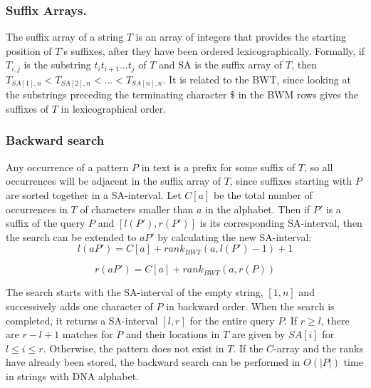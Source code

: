 \documentclass[runningheads,a4paper]{llncs}
\begin{document}
\subsubsection{Suffix Arrays.} The suffix array of a string $T$ is an array of integers that provides the starting position of $T$'s suffixes, after they have been ordered lexicographically. Formally, if $T_{i,j}$ is the substring $t_i t_{i+1} \ldots t_j$ of $T$ and SA is the suffix array of $T$, then $T_{SA[1],n}<T_{SA[2],n}<\ldots <T_{SA[n],n}$. It is related to the BWT, since looking at the substrings preceding the terminating character $\$$ in the BWM rows gives the suffixes of $T$ in lexicographical order. 
\subsubsection{Backward search}
Any occurrence of a pattern $P$ in text is a prefix for some suffix of $T$, so all occurrences will be adjacent in the suffix array of $T$, since suffixes starting with $P$ are sorted together in a SA-interval. Let $C[a]$ be the total number of occurrences in $T$ of characters smaller than $a$ in the alphabet. Then if $P'$ is a suffix of the query $P$ and $[l(P'),r(P')]$ is its corresponding SA-interval, then the search can be extended to $aP'$ by calculating the new SA-interval:
\newline
\begin{equation} 
l(aP')=C[a]+rank_{BWT}(a,l(P')-1)+1 
\end{equation} 

\begin{equation} 
r(aP')=C[a]+rank_{BWT}(a,r(P))
\end{equation}

The search starts with the SA-interval of the empty string, $[1,n]$ and successively adds one character of $P$ in backward order. When the search is completed, it returns a SA-interval $[l,r]$ for the entire query $P$. If $r \geq l$, there are $r-l+1$ matches for $P$ and their locations in $T$ are given by $SA[i]$ for $l \leq i \leq r$. Otherwise, the pattern does not exist in $T$. If the $C$-array and the ranks have already been stored, the backward search can be performed in $O(|P|)$ time in strings with DNA alphabet.
\end{document}
